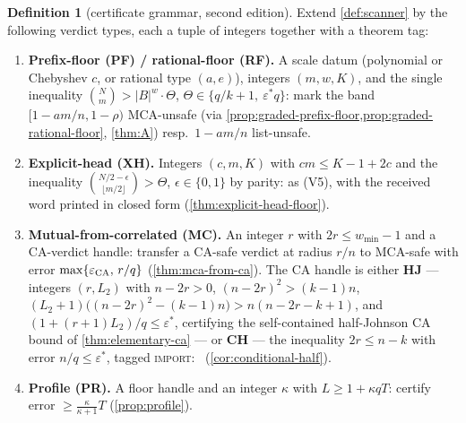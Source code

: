 \documentclass[11pt]{article}
\theoremstyle{definition}
\newtheorem{definition}[definition]{Definition}
\theoremstyle{remark}
\newcommand{\B}{B}
\begin{document}
\begin{definition}[certificate grammar, second edition]\label{def:certificate-v2}
Extend \cref{def:scanner} by the following verdict types, each a tuple of integers together with a theorem tag:
\begin{enumerate}[label=\textup{(V\arabic*)},leftmargin=2.6em,start=5]
\item \textbf{Prefix-floor \textup(PF\textup) / rational-floor \textup(RF\textup).} A scale datum \textup(polynomial or Chebyshev $c$, or rational type $(a,e)$\textup), integers $(m,w,K)$, and the single inequality $\binom Nm>|\B|^w\cdot\Theta$, $\Theta\in\{q/k+1,\ \varepsilon^*q\}$: mark the band $[1-am/n,1-\rho)$ MCA-unsafe \textup(via \cref{prop:graded-prefix-floor,prop:graded-rational-floor}, \cref{thm:A}\textup) resp.\ $1-am/n$ list-unsafe.
\item \textbf{Explicit-head \textup(XH\textup).} Integers $(c,m,K)$ with $cm\le K-1+2c$ and the inequality $\binom{N/2-\epsilon}{\lfloor m/2\rfloor}>\Theta$, $\epsilon\in\{0,1\}$ by parity: as \textup{(V5)}, with the received word printed in closed form \textup(\cref{thm:explicit-head-floor}\textup).
\item \textbf{Mutual-from-correlated \textup(MC\textup).} An integer $r$ with $2r\le w_{\min}-1$ and a CA-verdict handle: transfer a CA-safe verdict at radius $r/n$ to MCA-safe with error $\max\{\varepsilon_{\rm CA},\,r/q\}$ \textup(\cref{thm:mca-from-ca}\textup). The CA handle is either \textbf{HJ} --- integers $(r,L_2)$ with $n-2r>0$, $(n-2r)^2>(k-1)n$, $(L_2+1)\bigl((n-2r)^2-(k-1)n\bigr)>n(n-2r-k+1)$, and $(1+(r+1)L_2)/q\le\varepsilon^*$, certifying the self-contained half-Johnson CA bound of \cref{thm:elementary-ca} --- or \textbf{CH} --- the inequality $2r\le n-k$ with error $n/q\le\varepsilon^*$, tagged \textup{\textsc{import}}:~\cite[Thm.~4.1]{BCIKS20} \textup(\cref{cor:conditional-half}\textup).
\item \textbf{Profile \textup(PR\textup).} A floor handle and an integer $\kappa$ with $L\ge1+\kappa q T$: certify error $\ge\frac{\kappa}{\kappa+1}T$ \textup(\cref{prop:profile}\textup).
\end{enumerate}
\end{definition}
\end{document}
